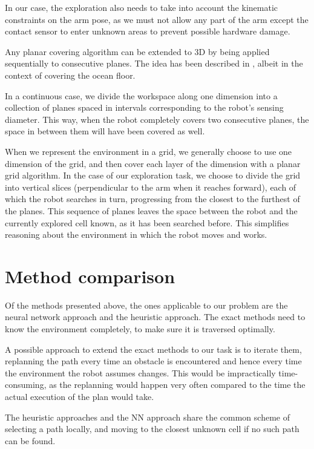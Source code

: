 \documentclass[buriama8_dp.tex]{subfiles}
\begin{document}
In our case, the exploration also needs to take into account the kinematic constraints on the arm pose, as we must not allow any part of the arm except the contact sensor to enter unknown areas to prevent possible hardware damage.

Any planar covering algorithm can be extended to 3D by being applied sequentially to consecutive planes. The idea has been described in \cite{gen3d}, albeit in the context of covering the ocean floor.

In a continuous case, we divide the workspace along one dimension into a collection of planes spaced in intervals corresponding to the robot's sensing diameter. This way, when the robot completely covers two consecutive planes, the space in between them will have been covered as well.

When we represent the environment in a grid, we generally choose to use one dimension of the grid, and then cover each layer of the dimension with a planar grid algorithm. In the case of our exploration task, we choose to divide the grid into vertical slices (perpendicular to the arm when it reaches forward), each of which the robot searches in turn, progressing from the closest to the furthest of the planes. This sequence of planes leaves the space between the robot and the currently explored cell known, as it has been searched before. This simplifies reasoning about the environment in which the robot moves and works.

\section{Method comparison}
\label{sec:cpp_comp}

Of the methods presented above, the ones applicable to our problem are the neural network approach and the heuristic approach. The exact methods need to know the environment completely, to make sure it is traversed optimally.

A possible approach to extend the exact methods to our task is to iterate them, replanning the path every time an obstacle is encountered and hence every time the environment the robot assumes changes. This would be impractically time-consuming, as the replanning would happen very often compared to the time the actual execution of the plan would take.

The heuristic approaches and the NN approach share the common scheme of selecting a path locally, and moving to the closest unknown cell if no such path can be found. 
\end{document}
